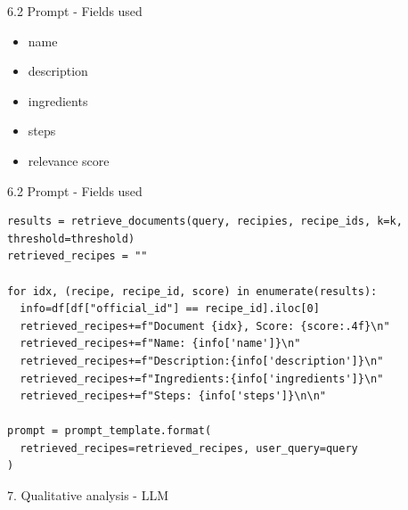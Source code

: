 \documentclass{beamer}
\begin{document}
\begin{frame}{6.2 Prompt - Fields used}
  \begin{itemize}
    \item name
    \item description
    \item ingredients
    \item steps
    \item relevance score
  \end{itemize}
\end{frame}

\begin{frame}[fragile]{6.2 Prompt - Fields used}
  \begin{verbatim}
results = retrieve_documents(query, recipies, recipe_ids, k=k, threshold=threshold)
retrieved_recipes = ""

for idx, (recipe, recipe_id, score) in enumerate(results):
  info=df[df["official_id"] == recipe_id].iloc[0]
  retrieved_recipes+=f"Document {idx}, Score: {score:.4f}\n"
  retrieved_recipes+=f"Name: {info['name']}\n"
  retrieved_recipes+=f"Description:{info['description']}\n"
  retrieved_recipes+=f"Ingredients:{info['ingredients']}\n"
  retrieved_recipes+=f"Steps: {info['steps']}\n\n"

prompt = prompt_template.format(
  retrieved_recipes=retrieved_recipes, user_query=query
)
  \end{verbatim}
\end{frame}

\begin{frame}{7. Qualitative analysis - LLM}
\end{frame}
\end{document}
